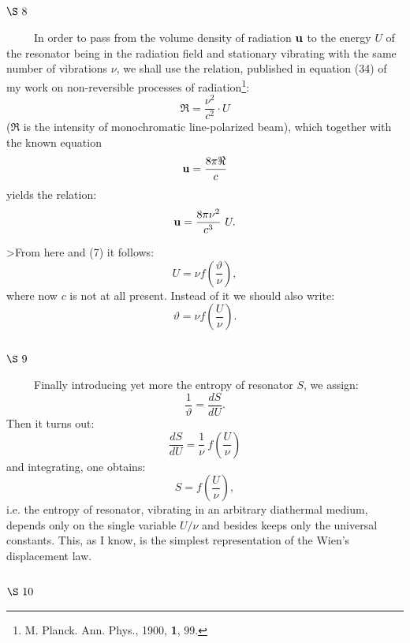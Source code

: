 \documentclass{article}
\begin{document}
\vspace{0.5cm}
\subsection*{
{\bf $\S~8$}}
\vspace{0.3cm}
  
~~~~~In order to pass from the volume density of radiation ${\cal \bf u}$ 
to the energy $U$ of the resonator being in the radiation field and 
stationary vibrating with the same number of vibrations $\nu$, 
we shall use the relation, published in equation (34) of my work 
on non-reversible processes of radiation\footnote{M. Planck. Ann. Phys., 
1900, {\bf 1}, 99.}:
$$
\Re = \frac{\nu^2}{c^2} \cdot U
$$
($\Re$ is the intensity of monochromatic line-polarized beam), 
which together with the known equation
$$
{\cal \bf u} = \frac{8 \pi \Re}{c}
$$
yields the relation: 
\begin{equation}
{\cal \bf u} = \frac{8 \pi \nu^2}{c^3}~U.
\end{equation}

>From here and (7) it follows:
$$
U = \nu f \left( \frac{\vartheta}{\nu} \right),
$$
where now $c$ is not at all present. Instead of it we should also write:
$$
\vartheta = \nu f \left( \frac{U}{\nu} \right).
$$

\vspace{0.5cm}
\subsection*{
{\bf $\S~9$}}
\vspace{0.3cm}

~~~~~Finally introducing yet more the entropy of resonator $S$, 
we assign:
\begin{equation}
\frac{1}{\vartheta} = \frac{dS}{dU}.
\end{equation}
Then it turns out:
$$
\frac{dS}{dU} = \frac{1}{\nu} ~f\left( \frac{U}{\nu} \right)
$$
and integrating, one obtains: 
\begin{equation}
S = f\left( \frac{U}{\nu} \right),
\end{equation}
i.e. the entropy of resonator, vibrating in an arbitrary diathermal medium, 
depends only on the single variable $U/\nu$ and besides keeps only 
the universal constants. 
This, as I know, is the simplest representation of the Wien's displacement law.

\vspace{0.5cm}
\subsection*{
{\bf $\S~10$}}
\vspace{0.3cm}
\end{document}
